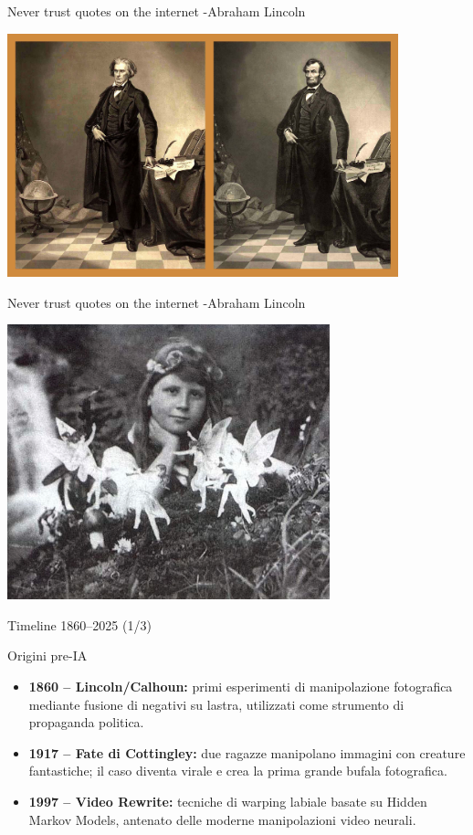 \documentclass[12pt]{beamer}
\begin{document}
\begin{frame}{Never trust quotes on the internet -Abraham Lincoln}
  \begin{center}
    \includegraphics[width=0.85\textwidth]{Pic/Licon_deepfake.jpg}
  \end{center}
\end{frame}

\begin{frame}{Never trust quotes on the internet -Abraham Lincoln}
  \begin{center}
    \includegraphics[width=0.7\textwidth]{Pic/deepold.png}
  \end{center}
\end{frame}




\begin{frame}{Timeline 1860–2025 (1/3)}
  \begin{alertblock}{Origini pre-IA}
    \begin{itemize}
      \item \textbf{1860 – Lincoln/Calhoun:} primi esperimenti di manipolazione fotografica mediante fusione di negativi su lastra, utilizzati come strumento di propaganda politica.
      \item \textbf{1917 – Fate di Cottingley:} due ragazze manipolano immagini con creature fantastiche; il caso diventa virale e crea la prima grande bufala fotografica.
      \item \textbf{1997 – Video Rewrite:} tecniche di warping labiale basate su Hidden Markov Models, antenato delle moderne manipolazioni video neurali.\cite{video_rewrite}
    \end{itemize}
  \end{alertblock}
\end{frame}
\end{document}
